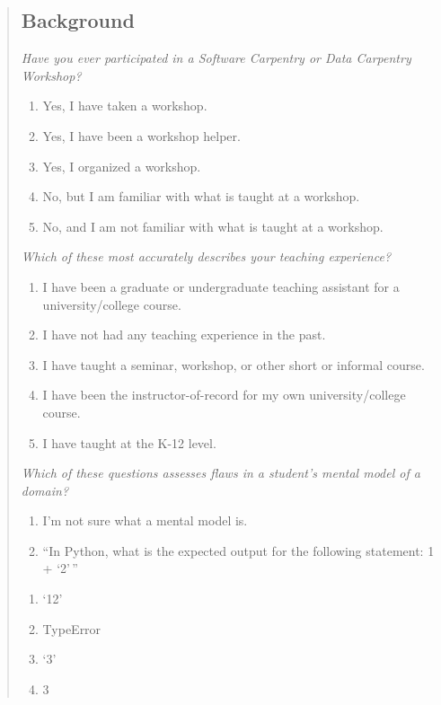 \begin{quote}
\subsection{Background}\label{background}

\emph{Have you ever participated in a Software Carpentry or Data
Carpentry Workshop?}

\begin{enumerate}
\def\labelenumi{\arabic{enumi}.}
\itemsep1pt\parskip0pt
\item
  Yes, I have taken a workshop.
\item
  Yes, I have been a workshop helper.
\item
  Yes, I organized a workshop.
\item
  No, but I am familiar with what is taught at a workshop.
\item
  No, and I am not familiar with what is taught at a workshop.
\end{enumerate}

\emph{Which of these most accurately describes your teaching
experience?}

\begin{enumerate}
\def\labelenumi{\arabic{enumi}.}
\itemsep1pt\parskip0pt
\item
  I have been a graduate or undergraduate teaching assistant for a
  university/college course.
\item
  I have not had any teaching experience in the past.
\item
  I have taught a seminar, workshop, or other short or informal course.
\item
  I have been the instructor-of-record for my own university/college
  course.
\item
  I have taught at the K-12 level.
\end{enumerate}

\emph{Which of these questions assesses flaws in a student's mental
model of a domain?}

\begin{enumerate}
\def\labelenumi{\arabic{enumi}.}
\itemsep1pt\parskip0pt
\item
  I'm not sure what a mental model is.
\item
  ``In Python, what is the expected output for the following statement:
  1 + `2'\,''
\end{enumerate}

\begin{enumerate}
\def\labelenumi{(\alph{enumi})}
\itemsep1pt\parskip0pt
\item
  `12'
\item
  TypeError
\item
  `3'
\item
  3
\end{enumerate}


\end{quote}

